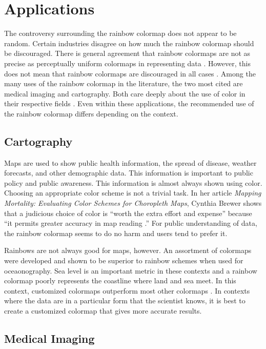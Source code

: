 \documentclass[journal,12pt]{IEEEtran}
\begin{document}
\section{Applications}

The controversy surrounding the rainbow colormap does not appear to be random.
Certain industries disagree on how much the rainbow colormap should be 
discouraged. There is general agreement that rainbow colormaps are not as 
precise as perceptually uniform colormaps in representing data 
\cite{blackvwhite}. However, this 
does not mean that rainbow colormaps are discouraged in all cases
 \cite{spectralschemes}. 
Among the many uses of the rainbow colormap in the
literature, the two most cited are
medical imaging and cartography. Both care deeply about the use of color in 
their respective fields \cite{colorguidelines, standardmedimg}. Even within
 these applications, the recommended use of the rainbow colormap differs
 depending on the context.
 
\subsection{Cartography}

Maps are used to show public health information, the spread of disease, weather
forecasts, and other demographic data. This information is important to
 public policy and public awareness. This information is almost always shown
 using color. Choosing an appropriate color scheme is not a trivial task. In her
article \textit{Mapping Mortality: Evaluating Color Schemes for Choropleth
Maps}, Cynthia Brewer shows that a judicious choice of color is ``worth 
the extra effort and expense'' because ``it permits greater accuracy in map
reading \cite{choropleth}.'' For public understanding of data, the rainbow colormap
seems to do no harm and users tend to prefer it.

Rainbows are not always good for maps, however. An assortment of colormaps were
developed and shown to be superior to rainbow schemes when used for oceaonography.
Sea level is an important metric in these contexts and a rainbow colormap poorly 
represents the coastline where land and sea meet. In this context, customized colormaps
outperform most other colormaps \cite{oceanography}. In contexts where the data are in a particular form
that the scientist knows, it is best to create a customized colormap that gives 
more accurate results.

\subsection{Medical Imaging}
\end{document}
